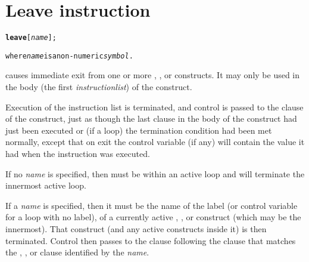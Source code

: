 \chapter{Leave instruction}\label{refleave}
\index{,}
\begin{shaded}
\begin{alltt}
\textbf{leave} [\emph{name}];

where \emph{name} is a non-numeric \emph{symbol}.
\end{alltt}
\end{shaded}
  causes immediate exit from one or more ,
, or  constructs.
It may only be used in the body (the first \emph{instructionlist})
of the construct.
 
Execution of the instruction list is terminated, and control is
passed to the  clause of the construct, just as though the
last clause in the body of the construct had just been executed or (if
a loop) the termination condition had been met normally, except that on
exit the control variable (if any) will contain the value it had when
the  instruction was executed.
 
If no \emph{name} is specified, then  must be
within an active loop and will terminate the innermost active loop.
 
If a \emph{name} is specified, then it must be the name of the
label (or control variable for a loop with no label), of a currently
active , , or  construct
(which may be the innermost).  That construct (and any active constructs
inside it) is then terminated.  Control then passes to the clause
following the  clause that matches the
, , or  clause identified by the
\emph{name}.

